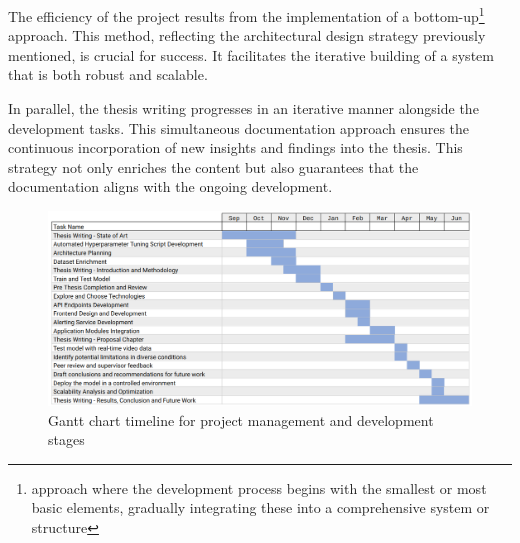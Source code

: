 The efficiency of the project results from the implementation of a bottom-up\footnote{approach where the development process begins with the smallest or most basic elements, gradually integrating these into a comprehensive system or structure} approach. This method, reflecting the architectural design strategy previously mentioned, is crucial for success. It facilitates the iterative building of a system that is both robust and scalable.

In parallel, the thesis writing progresses in an iterative manner alongside the development tasks. This simultaneous documentation approach ensures the continuous incorporation of new insights and findings into the thesis. This strategy not only enriches the content but also guarantees that the documentation aligns with the ongoing development.

\begin{figure}[ht]
    \centering 
    \includegraphics[width=\textwidth]{figs/gantt.png} %
        \caption{Gantt chart timeline for project management and development stages}
        \label{fig:gantt-chart}
\end{figure}
